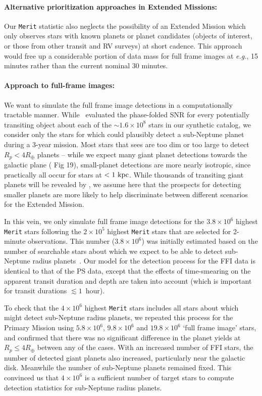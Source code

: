 \paragraph{Alternative prioritization approaches in Extended Missions:}
Our \texttt{Merit} statistic also neglects the possibility of an Extended
Mission which only observes stars with known planets or planet
candidates (\tesss objects of interest, or those from other transit
and RV surveys) at short cadence.  This approach would free up a
considerable portion of \tesss data mass for full frame images at
\textit{e.g.}, 15 minutes rather than the current nominal 30 minutes.

\paragraph{Approach to full-frame images:}
\label{sec:FFI_simulation}
We want to simulate the full frame image detections in a
computationally tractable manner.  While~
evaluated the phase-folded SNR for every potentially transiting object
about each of the $\sim\!1.6\times10^8$ stars in our synthetic catalog,
we consider only the stars for which \tess could plausibly detect a
sub-Neptune planet during a 3-year mission.  Most stars that
\tess sees are too dim or too large to detect $R_p<4R_\oplus$ planets
-- while we expect many giant planet detections towards the galactic
plane ( Fig 19), small-planet detections are
more nearly isotropic, since practically all occur for stars at
$<1\rm\ kpc$.  While thousands of transiting giant planets will be revealed by \tess,
we assume here that the prospects for detecting smaller planets are more likely
to help discriminate between different scenarios for the Extended Mission.

In this vein, we only simulate full frame image detections for the
$3.8\times10^6$ highest \texttt{Merit} stars following the
$2\times10^5$ highest \texttt{Merit} stars that are selected for 2-minute observations.
This number ($3.8\times10^6$) was initially estimated based
on the number of searchable stars about which we expect \tess to be
able to detect sub-Neptune radius
planets~\citep{winn_searchable_2013}. Our model for the detection process for the FFI data is 
identical to that of the PS data, except that the effects of time-smearing on
the apparent transit duration and depth are taken into account (which is
important for transit durations $\lesssim 1$~hour).

To check that the $4\times10^6$ highest \texttt{Merit} stars includes 
all stars about which \tess might detect sub-Neptune radius planets, 
we repeated this process for the Primary Mission using $5.8\times10^6$,
$9.8\times10^6$ and $19.8\times10^6$ `full frame image' stars, and
confirmed that there was no significant difference in the planet
yields at $R_p\le4R_\oplus$ between any of the cases.
With an increased number of FFI stars, the number of detected giant planets also increased,
particularly near the galactic
disk.  Meanwhile the number of sub-Neptune planets remained
fixed. This convinced us that $4\times10^6$ is a sufficient
number of target stars to compute detection statistics for sub-Neptune radius 
planets.
